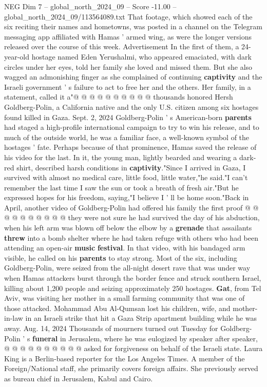 \begin{textsample}{NEG Dim 7 – global\_north\_2024\_09 – Score -11.00 – global\_north\_2024\_09/113564089.txt}
That footage, which showed each of the six reciting their names and hometowns, was posted in a channel on the Telegram messaging app affiliated with Hamas ' armed wing, as were the longer versions released over the course of this week.
Advertisement In the first of them, a 24-year-old hostage named Eden Yerushalmi, who appeared emaciated, with dark circles under her eyes, told her family she loved and missed them.
But she also wagged an admonishing finger as she complained of continuing \textbf{captivity} and the Israeli government ' s failure to act to free her and the others.
Her family, in a statement, called it a"@ @ @ @ @ @ @ @ @ @ thousands honored Hersh Goldberg-Polin, a California native and the only U.S. citizen among six hostages found killed in Gaza.
Sept. 2, 2024 Goldberg-Polin ' s American-born \textbf{parents} had staged a high-profile international campaign to try to win his release, and to much of the outside world, he was a familiar face, a well-known symbol of the hostages ' fate.
Perhaps because of that prominence, Hamas saved the release of his video for the last.
In it, the young man, lightly bearded and wearing a dark-red shirt, described harsh conditions in \textbf{captivity}."Since I arrived in Gaza, I survived with almost no medical care, little food, little water,"he said."I can't remember the last time I saw the sun or took a breath of fresh air."But he expressed hopes for his freedom, saying,"I believe I ' ll be home soon."Back in April, another video of Goldberg-Polin had offered his family the first proof @ @ @ @ @ @ @ @ @ @ they were not sure he had survived the day of his abduction, when his left arm was blown off below the elbow by a \textbf{grenade} that assailants \textbf{threw} into a bomb shelter where he had taken refuge with others who had been attending an open-air \textbf{music} \textbf{festival}.
In that video, with his bandaged arm visible, he called on his \textbf{parents} to stay strong.
Most of the six, including Goldberg-Polin, were seized from the all-night desert rave that was under way when Hamas attackers burst through the border fence and struck southern Israel, killing about 1,200 people and seizing approximately 250 hostages. \textbf{Gat}, from Tel Aviv, was visiting her mother in a small farming community that was one of those attacked.
Mohammad Abu Al-Qumsan lost his children, wife, and mother-in-law in an Israeli strike that hit a Gaza Strip apartment building while he was away.
Aug. 14, 2024 Thousands of mourners turned out Tuesday for Goldberg-Polin ' s \textbf{funeral} in Jerusalem, where he was eulogized by speaker after speaker, @ @ @ @ @ @ @ @ @ @ asked for forgiveness on behalf of the Israeli state.
Laura King is a Berlin-based reporter for the Los Angeles Times.
A member of the Foreign/National staff, she primarily covers foreign affairs.
She previously served as bureau chief in Jerusalem, Kabul and Cairo.

\end{textsample}
